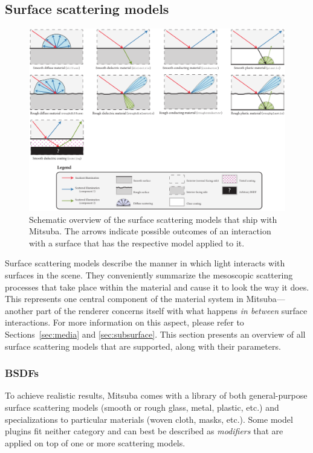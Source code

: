 \subsection{Surface scattering models}
\begin{figure}[h!]
\centering
\includegraphics[width=15.5cm]{images/bsdf_overview.pdf}
\caption{
	Schematic overview of the surface scattering models that ship with
	Mitsuba. The arrows indicate possible outcomes of an
	interaction with a surface that has the respective model applied to it.
	\vspace{4mm}
}
\end{figure}


\label{sec:bsdfs}
Surface scattering models describe the manner in which light interacts
with surfaces in the scene. They conveniently summarize the mesoscopic 
scattering processes that take place within the material and 
cause it to look the way it does.
This represents one central component of the material system in Mitsuba---another 
part of the renderer concerns itself with what happens 
\emph{in between} surface interactions. For more information on this aspect, 
please refer to Sections~\ref{sec:media} and \ref{sec:subsurface}.
This section presents an overview of all surface scattering models that are 
supported, along with their parameters.

\subsubsection*{BSDFs}
To achieve realistic results, Mitsuba comes with a library of both 
general-purpose surface scattering models (smooth or rough glass, metal,
plastic, etc.) and specializations to particular materials (woven cloth,
masks, etc.). Some model plugins fit neither category and can best be described
as \emph{modifiers} that are applied on top of one or more scattering models. 

